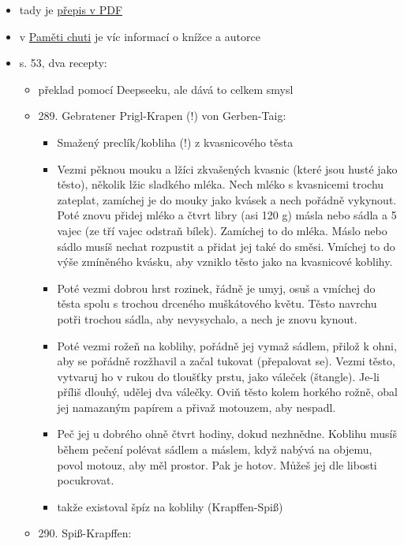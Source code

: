 \begin{itemize}
  \begin{itemize}
  \tightlist
  \item
    tady je
    \href{https://unipub.uni-graz.at/download/pdf/8109092.pdf\#page=54}{přepis
    v PDF}
  \item
    v
    \href{https://kulturni-dejiny.slu.cz/data/uploads/067/upvysledky/pamet_chuti_odborna-kniha_uplatnny_2020.pdf\#page=133}{Paměti
    chuti} je víc informací o knížce a autorce
  \item
    s. 53, dva recepty:

    \begin{itemize}
    \tightlist
    \item
      překlad pomocí Deepseeku, ale dává to celkem smysl
    \item
      289. Gebratener Prigl-Krapen (!) von Gerben-Taig:

      \begin{itemize}
      \tightlist
      \item
        Smažený preclík/kobliha (!) z kvasnicového těsta
      \item
        Vezmi pěknou mouku a lžíci zkvašených kvasnic (které jsou husté
        jako těsto), několik lžic sladkého mléka. Nech mléko s
        kvasnicemi trochu zateplat, zamíchej je do mouky jako kvásek a
        nech pořádně vykynout. Poté znovu přidej mléko a čtvrt libry
        (asi 120 g) másla nebo sádla a 5 vajec (ze tří vajec odstraň
        bílek). Zamíchej to do mléka. Máslo nebo sádlo musíš nechat
        rozpustit a přidat jej také do směsi. Vmíchej to do výše
        zmíněného kvásku, aby vzniklo těsto jako na kvasnicové koblihy.
      \item
        Poté vezmi dobrou hrst rozinek, řádně je umyj, osuš a vmíchej do
        těsta spolu s trochou drceného muškátového květu. Těsto navrchu
        potři trochou sádla, aby nevysychalo, a nech je znovu kynout.
      \item
        Poté vezmi rožeň na koblihy, pořádně jej vymaž sádlem, přilož k
        ohni, aby se pořádně rozžhavil a začal tukovat (přepalovat se).
        Vezmi těsto, vytvaruj ho v rukou do tloušťky prstu, jako váleček
        (štangle). Je-li příliš dlouhý, udělej dva válečky. Oviň těsto
        kolem horkého rožně, obal jej namazaným papírem a přivaž
        motouzem, aby nespadl.
      \item
        Peč jej u dobrého ohně čtvrt hodiny, dokud nezhnědne. Koblihu
        musíš během pečení polévat sádlem a máslem, když nabývá na
        objemu, povol motouz, aby měl prostor. Pak je hotov. Můžeš jej
        dle libosti pocukrovat.
      \item
        takže existoval špíz na koblihy (Krapffen-Spiß)
      \end{itemize}
    \item
      290. Spiß-Krapffen:


\end{itemize}
\end{itemize}
\end{itemize}
